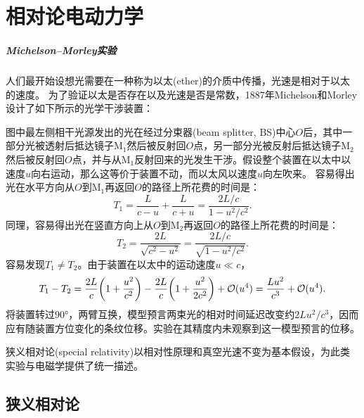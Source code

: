\chapter{相对论电动力学}
\label{chap:relativistic electromagnetic}


\paragraph{Michelson--Morley实验}

人们最开始设想光需要在一种称为以太(ether)的介质中传播，光速是相对于以太的速度。
为了验证以太是否存在以及光速是否是常数，1887年Michelson和Morley设计了如下所示的光学干涉装置：
\begin{notecaptionblock}
	\label{fig:Michelson-Morley}
\end{notecaptionblock}
图中最左侧相干光源发出的光在经过分束器(beam splitter, BS)中心$O$后，其中一部分光被透射后抵达镜子M$_1$然后被反射回$O$点，另一部分光被反射后抵达镜子M$_2$然后被反射回$O$点，并与从M$_1$反射回来的光发生干涉。假设整个装置在以太中以速度$u$向右运动，那么这等价于装置不动，而以太风以速度$u$向左吹来。
容易得出光在水平方向从$O$到M$_1$再返回$O$的路径上所花费的时间是：
\[
	T_1 = \frac L{c - u} + \frac L{c + u} = \frac{2L/c}{1 - u^2/c^2}.
\]
同理，容易得出光在竖直方向上从$O$到M$_2$再返回$O$的路径上所花费的时间是：
\[
	T_2 = \frac{2L}{\sqrt{c^2 - u^2}} = \frac{2L/c}{\sqrt{1 - u^2/c^2}}.
\]
容易发现$T_1 \neq T_2$。由于装置在以太中的运动速度$u \ll c$，%
\[
	T_1 - T_2 = \frac{2L}c\biggl(1 + \frac{u^2}{c^2}\biggr) - \frac{2L}c\biggl(1 + \frac{u^2}{2c^2}\biggr) + \mathcal{O}(u^4) = \frac{Lu^2}{c^3} + \mathcal{O}(u^4).
\]
将装置转过$\ang{90}$，两臂互换，模型预言两束光的相对时间延迟改变约$2Lu^2/c^3$，因而应有随装置方位变化的条纹位移。实验在其精度内未观察到这一模型预言的位移。

狭义相对论(special relativity)以相对性原理和真空光速不变为基本假设，为此类实验与电磁学提供了统一描述。

\section{狭义相对论}
\label{sec:special relativity}

